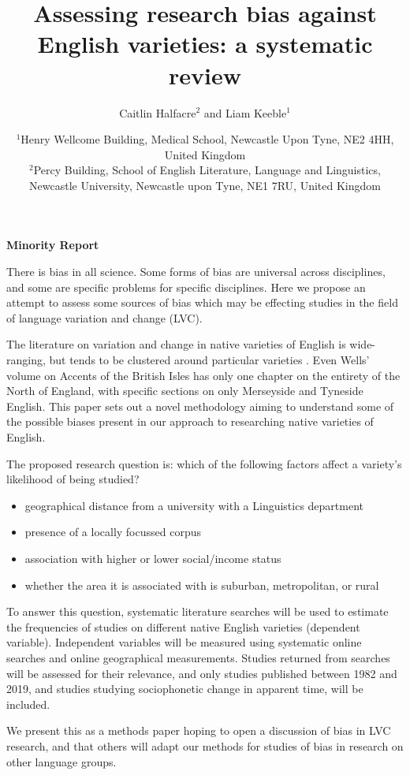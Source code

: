 \documentclass[12pt,a4paper]{article}
\title{Assessing research bias against English varieties: a systematic review}
\author{Caitlin Halfacre$^{2}$ and Liam Keeble$^{1}$}
\date{$^{1}$Henry Wellcome Building, Medical School, Newcastle Upon Tyne, NE2 4HH, United Kingdom\\
$^{2}$Percy Building, School of English Literature, Language and Linguistics, Newcastle University, Newcastle upon Tyne, NE1 7RU, United Kingdom\\}
\newcommand{\todocontentinline}[1]{\todo[color=RoyalPurple,inline]{#1}}
\begin{document}
\begin{center}
	\textbf{Minority Report}\\
\end{center}

\todocontentinline{Current word count 290}
There is bias in all science. Some forms of bias are universal across disciplines, and some are specific problems for specific disciplines. Here we propose an attempt to assess some sources of bias which may be effecting studies in the field of language variation and change (LVC).

The literature on variation and change in native varieties of English is wide-ranging, but tends to be clustered around particular varieties \cite{Trudgill2002}. Even Wells' \cite{Wells1982b} volume on Accents of the British Isles has only one chapter on the entirety of the North of England, with specific sections on only Merseyside and Tyneside English. This paper sets out a novel methodology aiming to understand some of the possible biases present in our approach to researching native varieties of English. 
	
The proposed research question is: which of the following factors affect a variety's likelihood of being studied?
	\begin{itemize}
		\item geographical distance from a university with a Linguistics department
		\item presence of a locally focussed corpus
		\item association with higher or lower social/income status
		\item whether the area it is associated with is suburban, metropolitan, or rural
	\end{itemize}


To answer this question, systematic literature searches will be used to estimate the frequencies of studies on different native English varieties (dependent variable). Independent variables will be measured using systematic online searches and online geographical measurements. Studies returned from searches will be assessed for their relevance, and only studies published between 1982 \cite{Wells1982b} and 2019, and studies studying sociophonetic change in apparent time, will be included.

We present this as a methods paper hoping to open a discussion of bias in LVC research, and that others will adapt our methods for studies of bias in research on other language groups.


\end{document}
